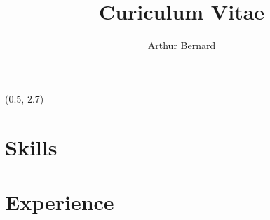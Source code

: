 \documentclass[a4paper,11pt]{arthur-cv}
\title{Curiculum Vitae}
\author{Arthur Bernard}
\begin{document}
\makeprofile %

\begin{textblock}{17}(0.5, 2.7)

  \begin{minipage}[t]{0.33\textwidth}
  
    \section{Skills}

    \hfill

  \end{minipage}
  \begin{minipage}[t]{0.66\textwidth}
  
    \section{Experience}

  \end{minipage}

\end{textblock}
\end{document}
